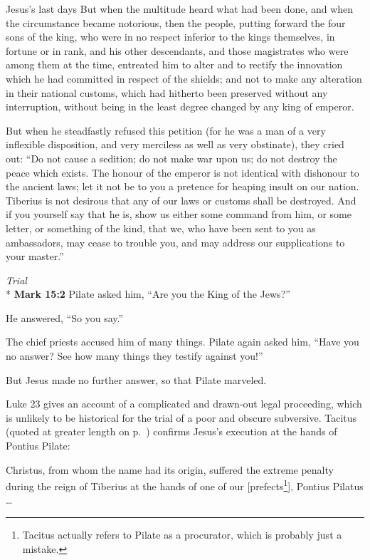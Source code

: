 \documentclass[10pt,twoside]{article} %
\newcommand{\quotesize}{\normalsize{}}
\newcommand{\comm}[1]{\begingroup \color{black!50} #1\endgroup}
\newenvironment{quotetext}{\begingroup\quotesize}{\endgroup}
\newcommand{\intex}[1]{\index[texts]{#1}}
\newcommand{\reftex}[1]{#1\intex{#1}}
\newcommand{\bible}[2]{\begin{quotetext}\textbf{#1}\intex{#1} #2\end{quotetext}}
\newcommand{\gospelmark}[2]{\bible{Mark #1}{#2}}
\newcommand{\subhead}[1]{\emph{#1}\\*}
\begin{document}
\begin{section}{Jesus's last days}
\begin{quotetext}
But when the multitude heard what had been
done, and when the circumstance became notorious, then the people,
putting forward the four sons of the king, who were in no respect
inferior to the kings themselves, in fortune or in rank, and his other
descendants, and those magistrates who were among them at the time,
entreated him to alter and to rectify the innovation which he had
committed in respect of the shields; and not to make any alteration in
their national customs, which had hitherto been preserved without any
interruption, without being in the least degree changed by any king of
emperor.

But when he steadfastly refused this petition (for he was a
man of a very inflexible disposition, and very merciless as well as
very obstinate), they cried out: ``Do not cause a sedition; do not make
war upon us; do not destroy the peace which exists. The honour of the
emperor is not identical with dishonour to the ancient laws; let it
not be to you a pretence for heaping insult on our nation. Tiberius is
not desirous that any of our laws or customs shall be destroyed. And
if you yourself say that he is, show us either some command from him,
or some letter, or something of the kind, that we, who have been sent
to you as ambassadors, may cease to trouble you, and may address our
supplications to your master.''
\end{quotetext}


\subhead{Trial}
\gospelmark{15:2}{
Pilate asked him, ``Are you the King of the Jews?''

He answered, ``So you say.''

  The chief priests accused him of many things.   Pilate again asked him, ``Have you no answer? See how many things they testify against you!''

  But Jesus made no further answer, so that Pilate marveled. 
}

\comm{\reftex{Luke 23} gives an account of a complicated and drawn-out legal proceeding, which is unlikely to be
historical for the trial of a poor and obscure subversive.
Tacitus (quoted at greater length on p.~\pageref{tacitus}) confirms
Jesus's execution at the hands of Pontius Pilate:}

\begin{quotetext}
Christus, from whom the name had its origin, suffered
the extreme penalty during the reign of Tiberius at the hands of one
of our [prefects\footnote{Tacitus actually refers to Pilate as a procurator, which is probably just a mistake.}], Pontius Pilatus \ldots
\end{quotetext}



\end{section}
\end{document}
